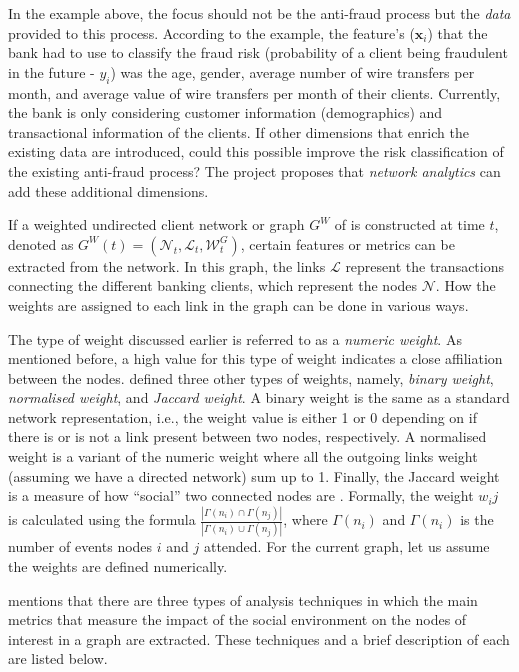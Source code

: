 In the example above, the focus should not be the anti-fraud process but the \textit{data} provided to this process. According to the example, the feature's ($\boldsymbol{x}_i$) that the bank had to use to classify the fraud risk (probability of a client being fraudulent in the future - $y_i$) was the age, gender, average number of wire transfers per month, and average value of wire transfers per month of their clients. Currently, the bank is only considering customer information (demographics) and transactional information of the clients. If other dimensions that enrich the existing data are introduced, could this possible improve the risk classification of the existing anti-fraud process? The project proposes that \textit{network analytics} can add these additional dimensions.

If a weighted undirected client network or graph $G^W$ of is constructed at time $t$, denoted as $G^W(t) = (\mathcal{N}_t,\mathcal{L}_t,\mathcal{W}^G_t)$, certain features or metrics can be extracted from the network. In this graph, the links $\mathcal{L}$ represent the transactions connecting the different banking clients, which represent the nodes $\mathcal{N}$. How the weights are assigned to each link in the graph can be done in various ways. 

The type of weight discussed earlier is referred to as a \textit{numeric weight}. As mentioned before, a high value for this type of weight indicates a close affiliation between the nodes. \citet{baesens2015fraud} defined three other types of weights, namely, \textit{binary weight}, \textit{normalised weight}, and \textit{Jaccard weight}. A binary weight is the same as a standard network representation, i.e., the weight value is either 1 or 0  depending on if there is or is not a link present between two nodes, respectively. A normalised weight is a variant of the numeric weight where all the outgoing links weight (assuming we have a directed network) sum up to 1. Finally, the Jaccard weight is a measure of how ``social'' two connected nodes are \citep*{gupte2012measuring}. Formally, the weight $w_ij$ is calculated using the formula $\frac{|\Gamma(n_i) \cap \Gamma(n_j)|} {|\Gamma(n_i) \cup  \Gamma(n_j)|}$, where $\Gamma(n_i)$ and $\Gamma(n_i)$ is the number of events nodes $i$ and $j$ attended. For the current graph, let us assume the weights are defined numerically.       

\citet{baesens2015fraud} mentions that there are three types of analysis techniques in which the main metrics that measure the impact of the social environment on the nodes of interest in a graph are extracted. These techniques and a brief description of each are listed below. 

